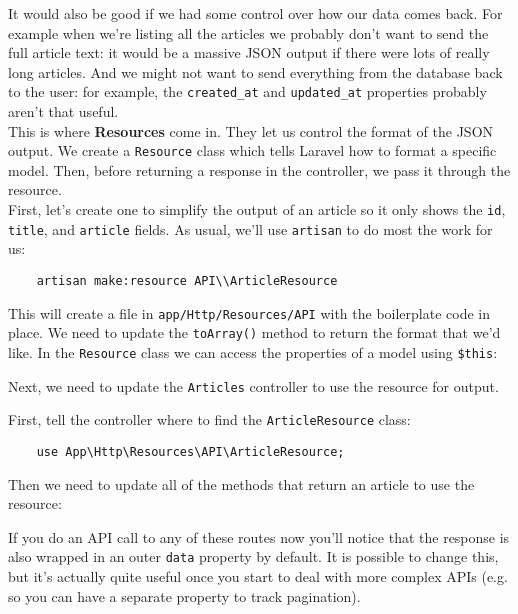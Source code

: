 It would also be good if we had some control over how our data comes back. For example when we're listing all the articles we probably don't want to send the full article text: it would be a massive JSON output if there were lots of really long articles. And we might not want to send everything from the database back to the user: for example, the \texttt{created\_at} and \texttt{updated\_at} properties probably aren't that useful.
\\

This is where \textbf{Resources} come in. They let us control the format of the JSON output. We create a \texttt{Resource} class which tells Laravel how to format a specific model. Then, before returning a response in the controller, we pass it through the resource.
\\

First, let's create one to simplify the output of an article so it only shows the \texttt{id}, \texttt{title}, and \texttt{article} fields. As usual, we'll use \texttt{artisan} to do most the work for us:

\begin{verbatim}
    artisan make:resource API\\ArticleResource
\end{verbatim}

This will create a file in \texttt{app/Http/Resources/API} with the boilerplate code in place. We need to update the \texttt{toArray()} method to return the format that we'd like. In the \texttt{Resource} class we can access the properties of a model using \texttt{\$this}:


Next, we need to update the \texttt{Articles} controller to use the resource for output.

First, tell the controller where to find the \texttt{ArticleResource} class:

\begin{verbatim}
    use App\Http\Resources\API\ArticleResource;
\end{verbatim}

Then we need to update all of the methods that return an article to use the resource:


If you do an API call to any of these routes now you'll notice that the response is also wrapped in an outer \texttt{data} property by default. It is possible to change this, but it's actually quite useful once you start to deal with more complex APIs (e.g. so you can have a separate property to track pagination).
\\

